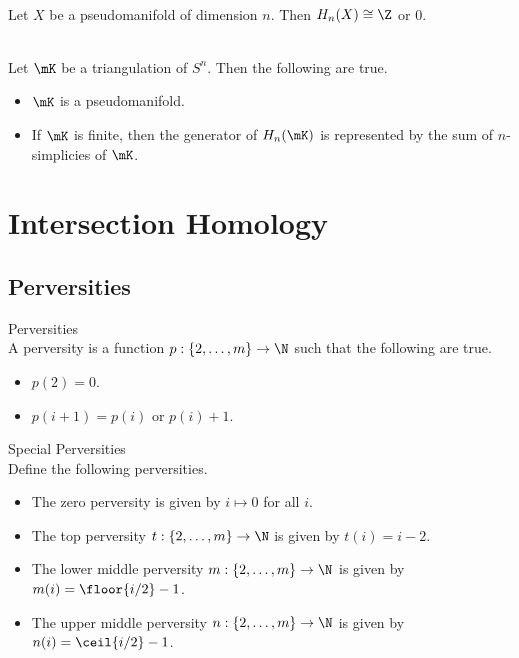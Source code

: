 \documentclass[a4paper]{article}
\begin{document}
\begin{lmm}{}{}\\
Let $X$ be a pseudomanifold of dimension $n$. Then $H_n(X)\cong\Z$ or $0$. 
\end{lmm}

\begin{lmm}{}{}\\
Let $\mK$ be a triangulation of $S^n$. Then the following are true. 
\begin{itemize}
\item $\mK$ is a pseudomanifold. 
\item If $\mK$ is finite, then the generator of $H_n(\mK)$ is represented by the sum of $n$-simplicies of $\mK$. 
\end{itemize}
\end{lmm}

\pagebreak
\section{Intersection Homology}
\subsection{Perversities}
\begin{defn}{Perversities}{}\\
A perversity is a function $p:\{2,\dots,m\}\to\N$ such that the following are true. 
\begin{itemize}
\item $p(2)=0$. 
\item $p(i+1)=p(i)$ or $p(i)+1$. 
\end{itemize}
\end{defn}

\begin{defn}{Special Perversities}{}\\
Define the following perversities. 
\begin{itemize}
\item The zero perversity is given by $i\mapsto 0$ for all $i$. 
\item The top perversity $t:\{2,\dots,m\}\to\N$ is given by $t(i)=i-2$. 
\item The lower middle perversity $m:\{2,\dots,m\}\to\N$ is given by $m(i)=\floor{i/2}-1$. 
\item The upper middle perversity $n:\{2,\dots,m\}\to\N$ is given by $n(i)=\ceil{i/2}-1$. 
\end{itemize}
\end{defn}
\end{document}
